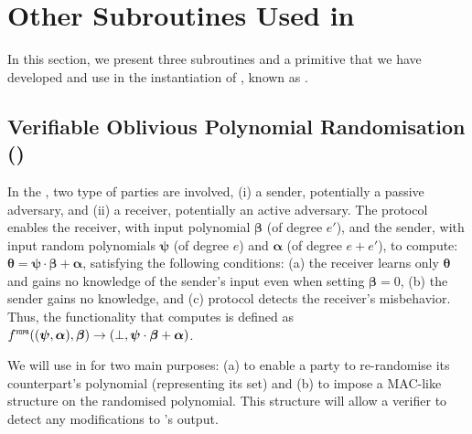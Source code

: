 

\vspace{-4.5mm}



\section{Other Subroutines Used in \withFai}\label{sec::subroutines}
\vspace{-1.4mm}

In this section, we present three subroutines and a primitive that we have developed and use in the instantiation of \p, known as \withFai. 


\vspace{-3mm}
\subsection{Verifiable Oblivious Polynomial Randomisation (\vopr)}\label{sec::vopr}
\vspace{-1.2mm}


In the \vopr, two type of parties are involved, (i) a sender, potentially a passive adversary, and (ii) a receiver, potentially an active adversary. The protocol enables the receiver, with input polynomial $\bm\beta$ (of degree $e'$), and the sender, with input random polynomials $\bm\psi$ (of degree $e$) and  $\bm{\alpha}$ (of degree $e+e'$),   to compute: $\bm\theta=\bm\psi\cdot \bm\beta+\bm\alpha$, satisfying the following conditions: (a) the receiver learns only $\bm\theta$ and gains no knowledge of the sender's input even when setting $\bm \beta=0$, (b) the sender gains no knowledge, and (c) protocol detects the receiver's misbehavior.  Thus, the functionality that  \vopr computes is defined as $f^{\scriptscriptstyle {\ensuremath{\mathtt{VOPR}}}}( (\bm\psi, \bm{\alpha}), \bm\beta)\rightarrow(\bot, \bm\psi\cdot \bm\beta+\bm\alpha)$. 

We will use {\vopr} in \withFai for two main purposes:  (a) to enable a party to re-randomise its counterpart's polynomial (representing its set) and (b) to impose a MAC-like structure on the randomised polynomial.  This structure will allow a verifier to detect any modifications to \vopr's output. 


